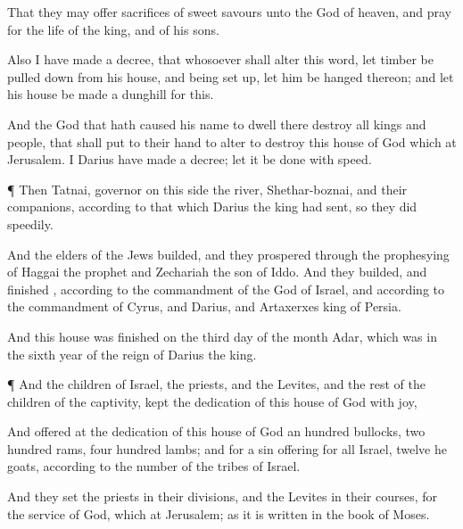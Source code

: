 {That they may
offer sacrifices of sweet
savours unto the
God of
heaven, and
pray for the
life of the
king, and of his
sons.

Also I have
made a
decree, that
whosoever shall
alter
this
word, let
timber be pulled
down
from his
house, and being set
up, let him be
hanged
thereon; and let his
house be
made a
dunghill
for
this.

And the
God that hath caused his
name to
dwell
there
destroy
all
kings and
people, that shall
put to their
hand to
alter
{} to
destroy
this
house of
God which
{} at
Jerusalem.
I
Darius have
made a
decree; let it be
done with
speed.


\par }{\PP {}¶
Then
Tatnai,
governor on this
side the
river,
Shethar-boznai, and their
companions,
according to that which
Darius the
king had
sent,
so they
did
speedily.

And the
elders of the
Jews
builded, and they
prospered through the
prophesying of
Haggai the
prophet and
Zechariah the
son of
Iddo. And they
builded, and
finished
{},
according to the
commandment of the
God of
Israel, and according to the
commandment of
Cyrus, and
Darius, and
Artaxerxes
king of
Persia.

And
this
house was
finished
on the
third
day of the
month
Adar, which
was in the
sixth
year of the
reign of
Darius the
king.


\par }{\PP {}¶ And the
children of
Israel, the
priests, and the
Levites, and the
rest of the
children of the
captivity,
kept the
dedication of
this
house of
God with
joy,

And
offered at the
dedication of
this
house of
God an
hundred
bullocks, two
hundred
rams,
four
hundred
lambs; and for a sin
offering
for
all
Israel,
twelve
he
goats, according to the
number of the
tribes of
Israel.

And they
set the
priests in their
divisions, and the
Levites in their
courses,
for the
service of
God, which
{} at
Jerusalem; as it is
written in the
book of
Moses.

}
